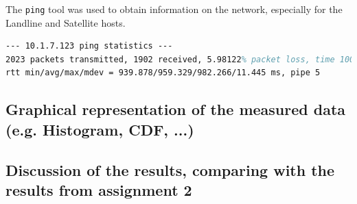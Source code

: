 \documentclass[parskip=full]{scrartcl}
\begin{document}
The \texttt{ping} tool was used to obtain information on the network, especially for the Landline and Satellite hosts.


\begin{lstlisting}[language=tex, breaklines, frame=single, caption={Landline Network Parameters}, label=lst:landlineNetwork, float, floatplacement=h]
--- 10.1.7.123 ping statistics ---
2023 packets transmitted, 1902 received, 5.98122% packet loss, time 1004ms
rtt min/avg/max/mdev = 939.878/959.329/982.266/11.445 ms, pipe 5
\end{lstlisting}


\subsection{Graphical representation of the measured data (e.g. Histogram, CDF, ...)}
\subsection{Discussion of the results, comparing with the results from assignment 2}




\end{document}
